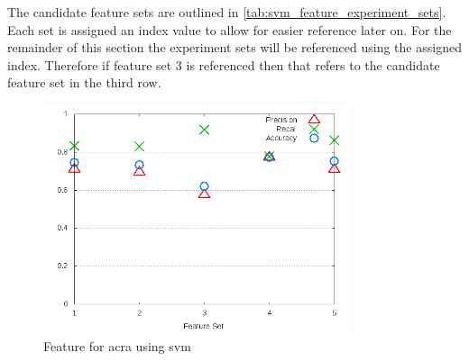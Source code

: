 The candidate feature sets are outlined in \autoref{tab:svm_feature_experiment_sets}. Each set is assigned an index value to allow for easier reference later on. For the remainder of this section the experiment sets will be referenced using the assigned index. Therefore if feature set 3 is referenced then that refers to the candidate feature set in the third row.



\begin{figure}[!t]
    \centering

        \includegraphics[width=0.8\textwidth]{images/svm/test_3/acra_sample_range}
        \caption{Feature for acra using \gls{svm}}
        \label{fig:test_3_acra_svm}
\end{figure}

